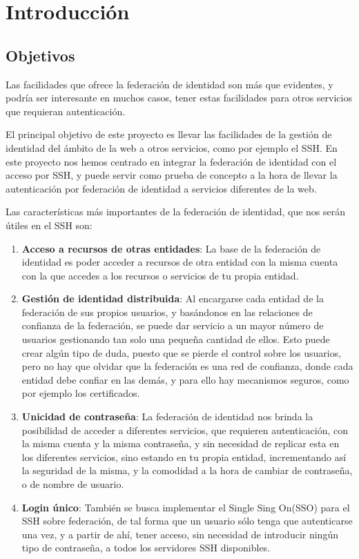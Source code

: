 \chapter{Introducción}
\section{Objetivos}

Las facilidades que ofrece la federación de identidad son más que
evidentes, y podría ser interesante en muchos casos, tener estas
facilidades para otros servicios que requieran autenticación.

El principal objetivo de este proyecto es llevar las facilidades de la
gestión de identidad del ámbito de la web a otros servicios, como por
ejemplo el SSH. En este proyecto nos hemos centrado en integrar la
federación de identidad con el acceso por SSH, y puede servir como
prueba de concepto a la hora de llevar la autenticación por federación
de identidad a servicios diferentes de la web.

Las características más importantes de la federación de identidad, que
nos serán útiles en el SSH son:
\begin{enumerate}

    \item \textbf{Acceso a recursos de otras entidades}: La base de la
    federación de identidad es poder acceder a recursos de otra
    entidad con la misma cuenta con la que accedes a los recursos o
    servicios de tu propia entidad.

    \item \textbf{Gestión de identidad distribuida}: Al encargarse
    cada entidad de la federación de sus propios usuarios, y
    basándonos en las relaciones de confianza de la federación, se
    puede dar servicio a un mayor número de usuarios gestionando tan
    solo una pequeña cantidad de ellos. Esto puede crear algún tipo de
    duda, puesto que se pierde el control sobre los usuarios, pero no
    hay que olvidar que la federación es una red de confianza, donde
    cada entidad debe confiar en las demás, y para ello hay mecanismos
    seguros, como por ejemplo los certificados.

    \item \textbf{Unicidad de contraseña}: La federación de identidad
    nos brinda la posibilidad de acceder a diferentes servicios, que
    requieren autenticación, con la misma cuenta y la misma
    contraseña, y sin necesidad de replicar esta en los diferentes
    servicios, sino estando en tu propia entidad, incrementando así la
    seguridad de la misma, y la comodidad a la hora de cambiar de
    contraseña, o de nombre de usuario.

    \item \textbf{Login único}: También se busca implementar el Single
    Sing On(SSO) para el SSH sobre federación, de tal forma que un
    usuario sólo tenga que autenticarse una vez, y a partir de ahí,
    tener acceso, sin necesidad de introducir ningún tipo de
    contraseña, a todos los servidores SSH disponibles.

\end{enumerate}

